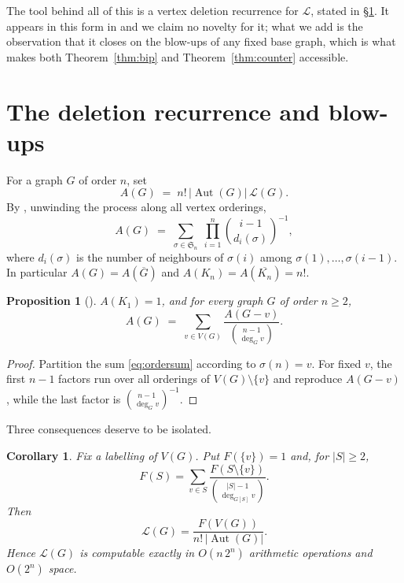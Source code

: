 \documentclass[11pt]{article}
\newtheorem{proposition}[theorem]{Proposition}
\newtheorem{corollary}[theorem]{Corollary}
\theoremstyle{definition}
\DeclareMathOperator{\Aut}{Aut}
\newcommand{\Lk}{\mathcal{L}}
\newcommand{\bin}[2]{\binom{#1}{#2}}
\begin{document}
The tool behind all of this is a vertex deletion recurrence for $\Lk$, stated in \S\ref{sec:prelim}. It appears in this form in \cite{MW} and we claim no novelty for it; what we add is the observation that it closes on the blow-ups of any fixed base graph, which is what makes both Theorem~\ref{thm:bip} and Theorem~\ref{thm:counter} accessible.

\section{The deletion recurrence and blow-ups}\label{sec:prelim}

For a graph $G$ of order $n$, set
\[
A(G)\;=\;n!\,\lvert\Aut(G)\rvert\,\Lk(G).
\]
By \cite[Thm.~16]{BMS14}, unwinding the process along all vertex orderings,
\begin{equation}\label{eq:ordersum}
A(G)\;=\;\sum_{\sigma\in \mathfrak{S}_n}\;\prod_{i=1}^{n}\bin{i-1}{d_i(\sigma)}^{-1},
\end{equation}
where $d_i(\sigma)$ is the number of neighbours of $\sigma(i)$ among $\sigma(1),\dots,\sigma(i-1)$. In particular $A(G)=A(\overline G)$ and $A(K_n)=A(\overline{K_n})=n!$.

\begin{proposition}[\cite{MW}]\label{prop:deletion}
$A(K_1)=1$, and for every graph $G$ of order $n\ge 2$,
\begin{equation}\label{eq:deletion}
A(G)\;=\;\sum_{v\in V(G)}\frac{A(G-v)}{\bin{n-1}{\deg_G v}} .
\end{equation}
\end{proposition}

\begin{proof}
Partition the sum \eqref{eq:ordersum} according to $\sigma(n)=v$. For fixed $v$, the first $n-1$ factors run over all orderings of $V(G)\setminus\{v\}$ and reproduce $A(G-v)$, while the last factor is $\bin{n-1}{\deg_Gv}^{-1}$.
\end{proof}

Three consequences deserve to be isolated.

\begin{corollary}\label{cor:algo}
Fix a labelling of $V(G)$. Put $F(\{v\})=1$ and, for $|S|\ge 2$,
\[
F(S)=\sum_{v\in S}\frac{F(S\setminus\{v\})}{\bin{|S|-1}{\deg_{G[S]}v}}.
\]
Then
\[
\Lk(G)=\frac{F(V(G))}{n!\,\lvert\Aut(G)\rvert}.
\]
Hence $\Lk(G)$ is computable exactly in $O(n\,2^n)$ arithmetic operations and $O(2^n)$ space.
\end{corollary}
\end{document}
